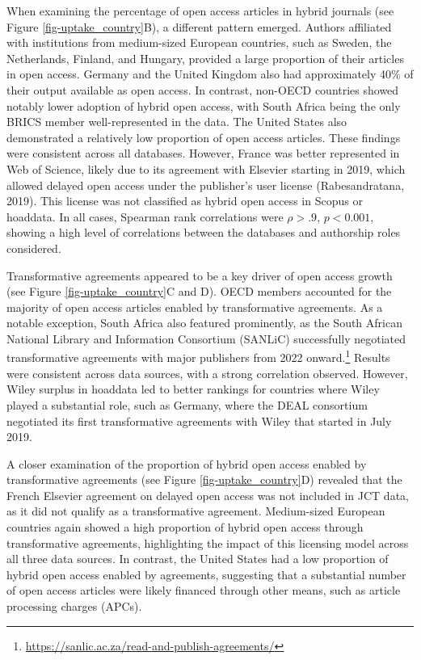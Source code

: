 \documentclass[a4paper,man,floatsintext,longtable,noextraspace,10pt]{apa6}
\begin{document}
When examining the percentage of open access articles in hybrid journals
(see Figure \ref{fig-uptake_country}B), a different pattern emerged.
Authors affiliated with institutions from medium-sized European
countries, such as Sweden, the Netherlands, Finland, and Hungary,
provided a large proportion of their articles in open access. Germany
and the United Kingdom also had approximately 40\% of their output
available as open access. In contrast, non-OECD countries showed notably
lower adoption of hybrid open access, with South Africa being the only
BRICS member well-represented in the data. The United States also
demonstrated a relatively low proportion of open access articles. These
findings were consistent across all databases. However, France was
better represented in Web of Science, likely due to its agreement with
Elsevier starting in 2019, which allowed delayed open access under the
publisher's user license (Rabesandratana, 2019). This license was not
classified as hybrid open access in Scopus or hoaddata. In all cases,
Spearman rank correlations were \(\rho > .9\), \(p < 0.001\), showing a
high level of correlations between the databases and authorship roles
considered.

Transformative agreements appeared to be a key driver of open access
growth (see Figure \ref{fig-uptake_country}C and D). OECD members
accounted for the majority of open access articles enabled by
transformative agreements. As a notable exception, South Africa also
featured prominently, as the South African National Library and
Information Consortium (SANLiC) successfully negotiated transformative
agreements with major publishers from 2022 onward.\footnote{\url{https://sanlic.ac.za/read-and-publish-agreements/}}
Results were consistent across data sources, with a strong correlation
observed. However, Wiley surplus in hoaddata led to better rankings for
countries where Wiley played a substantial role, such as Germany, where
the DEAL consortium negotiated its first transformative agreements with
Wiley that started in July 2019.

A closer examination of the proportion of hybrid open access enabled by
transformative agreements (see Figure \ref{fig-uptake_country}D)
revealed that the French Elsevier agreement on delayed open access was
not included in JCT data, as it did not qualify as a transformative
agreement. Medium-sized European countries again showed a high
proportion of hybrid open access through transformative agreements,
highlighting the impact of this licensing model across all three data
sources. In contrast, the United States had a low proportion of hybrid
open access enabled by agreements, suggesting that a substantial number
of open access articles were likely financed through other means, such
as article processing charges (APCs).
\end{document}
